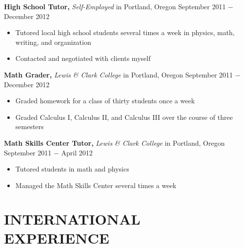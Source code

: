 \documentclass{res} %
\begin{document}
\begin{resume}
{\bf High School Tutor,} {\it Self-Employed} in Portland, Oregon \hfill September 2011 $-$ December 2012 %
\begin{itemize}[label={--}]
	\item Tutored local high school students several times a week in physics, math, writing, and organization
	\item Contacted and negotiated with clients myself
\end{itemize}

{\bf Math Grader,} {\it Lewis \& Clark College} in Portland, Oregon \hfill September 2011 $-$ December 2012 %
\begin{itemize}[label={--}]
	\item Graded homework for a class of thirty students once a week
	\item Graded Calculus I, Calculus II, and Calculus III over the course of three semesters
\end{itemize}

{\bf Math Skills Center Tutor,} {\it Lewis \& Clark College} in Portland, Oregon \hfill September 2011 $-$ April 2012 %
\begin{itemize}[label={--}]
	\item Tutored students in math and physics
	\item Managed the Math Skills Center several times a week
\end{itemize}


\section{INTERNATIONAL EXPERIENCE}


\end{resume}
\end{document}
